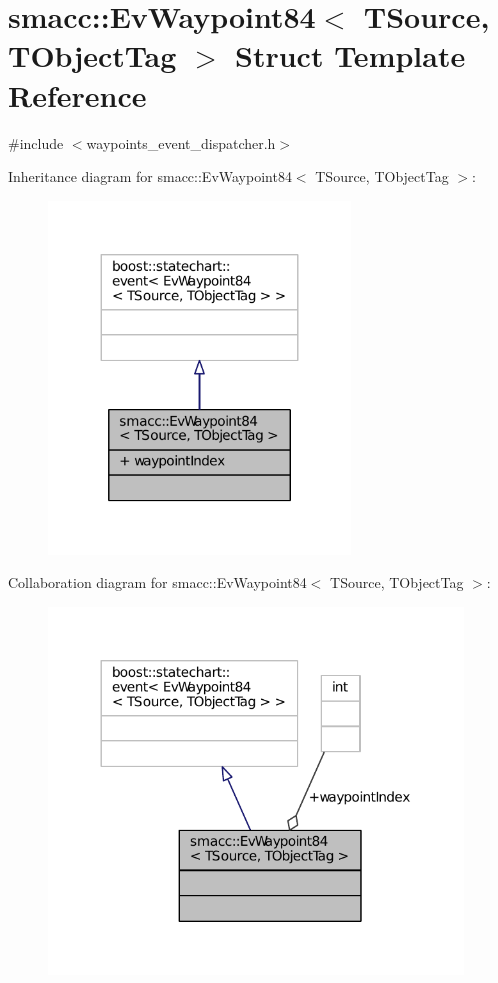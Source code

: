 \hypertarget{structsmacc_1_1EvWaypoint84}{}\section{smacc\+:\+:Ev\+Waypoint84$<$ T\+Source, T\+Object\+Tag $>$ Struct Template Reference}
\label{structsmacc_1_1EvWaypoint84}


{\ttfamily \#include $<$waypoints\+\_\+event\+\_\+dispatcher.\+h$>$}



Inheritance diagram for smacc\+:\+:Ev\+Waypoint84$<$ T\+Source, T\+Object\+Tag $>$\+:
\nopagebreak
\begin{figure}[H]
\begin{center}
\leavevmode
\includegraphics[width=227pt]{structsmacc_1_1EvWaypoint84__inherit__graph}
\end{center}
\end{figure}


Collaboration diagram for smacc\+:\+:Ev\+Waypoint84$<$ T\+Source, T\+Object\+Tag $>$\+:
\nopagebreak
\begin{figure}[H]
\begin{center}
\leavevmode
\includegraphics[width=312pt]{structsmacc_1_1EvWaypoint84__coll__graph}
\end{center}
\end{figure}
